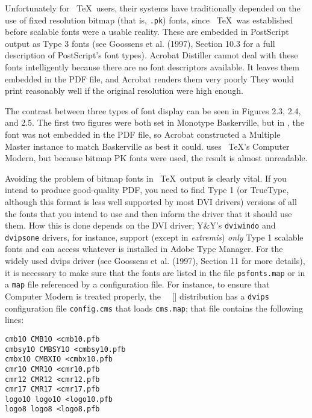  
Unfortunately for \ \TeX\  users, their systems have traditionally
depended on the use of fixed resolution bitmap (that is, \verb|.pk|)
fonts, since \ \TeX\  was established before scalable fonts were a
usable reality. These are embedded in PostScript output as Type 3 fonts
(see Goossens et al. (1997), Section 10.3 for a full description of
PostScript's font types). Acrobat Distiller cannot deal with these fonts
intelligently because there are no font descriptors available. It leaves
them embedded in the PDF file, and Acrobat renders them very poorly They
would print reasonably well if the original resolution were high enough. 

The contrast between three types of font display can be seen in Figures 2.3, 
2.4, and 2.5. The first two figures were both set in Monotype Baskerville, but in 
, the font was not embedded in the PDF file, so Acrobat constructed 
a Multiple Master instance to match Baskerville as best it could.  uses 
\ \TeX's Computer Modern, but because bitmap PK fonts were used, the result is 
almost unreadable. 

Avoiding the problem of bitmap fonts in \ \TeX\  output is clearly
vital. If you intend to produce good-quality PDF, you need to find Type
1 (or TrueType, although this format is less well supported by most DVI
drivers) versions of all the fonts that you intend to use and then
inform the driver that it should use them. How this is done depends on
the DVI driver; Y\&Y's \verb|dviwindo| and \verb|dvipsone| drivers, for
instance, support (except in \emph{extremis}) \emph{only} Type 1
scalable fonts and can access whatever is installed in Adobe Type
Manager. For the widely used dvips driver (see Goossens et al. (1997),
Section 11 for more details), it is necessary to make sure that the
fonts are listed in the file \verb|psfonts.map| or in a \verb|map| file
referenced by a configuration file. For instance, to ensure that
Computer Modern is treated properly, the \ \texlive\  [] distribution
has a \verb|dvips| configuration file \verb|config.cms| that loads
\verb|cms.map|; that file contains the following lines: 

\begin{verbatim}
cmb1O CMB1O <cmb10.pfb 
cmbsy1O CMBSY1O <cmbsy10.pfb 
cmbx1O CMBXIO <cmbx10.pfb 
cmr1O CMR1O <cmr10.pfb 
cmr12 CMR12 <cmr12.pfb 
cmr17 CMR17 <cmr17.pfb 
logo1O logo1O <logo10.pfb 
logo8 logo8 <logo8.pfb 
\end{verbatim}

